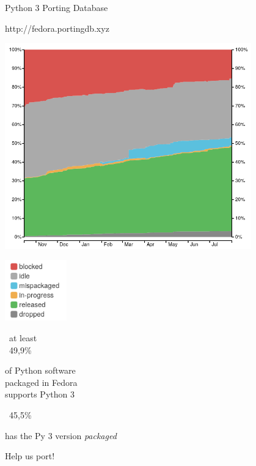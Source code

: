 \documentclass[1610,20pt]{beamer}
\newcommand\sk{\par\bigskip\bigskip\par}
\renewcommand\emph[1]{\textcolor{fedblue}{#1}}
\begin{document}
\begin{center}
\begin{frame}[fragile]
    Python 3 Porting Database

    \sk\sk

    http://fedora.portingdb.xyz
\end{frame}

\begin{frame}[fragile]
    \includegraphics[width=0.8\textwidth]{history-graph}

    \includegraphics[width=0.2\textwidth]{history-legend}

\end{frame}

\begin{frame}[fragile]
    ~{\color{mutegray}at least}~ \\
    {\huge ~49,9\%}     %

    of Python software \\
    packaged in Fedora \\
    supports Python 3
    \sk\pause
    {\huge ~45,5\%} %

    has the Py 3 version \emph{\textit{packaged}}
\end{frame}

\begin{frame}[fragile]
    Help us port!


\end{frame}
\end{center}
\end{document}
